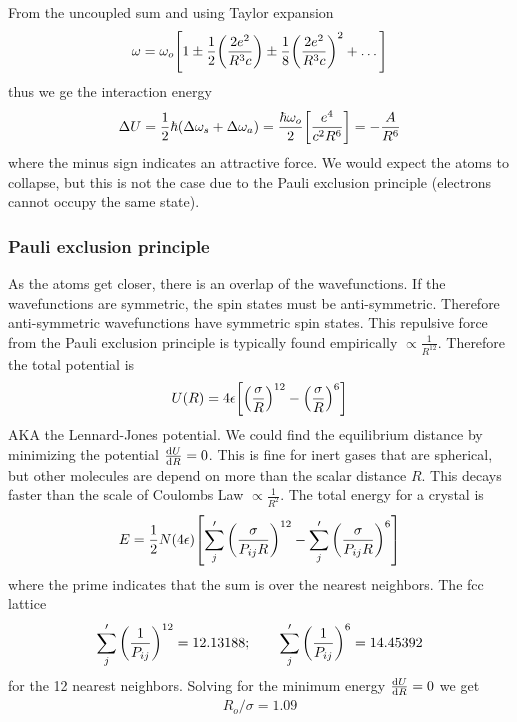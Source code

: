 \documentclass[../main.tex]{subfiles}
\begin{document}
From the uncoupled sum and using Taylor expansion
\begin{align*}
    \omega = \omega_o \qt[1 \pm \frac{1}{2} \qt(\frac{2e^2}{R^3c})
    \pm \frac{1}{8} \qt(\frac{2e^2}{R^3c})^2 + \dots]
\end{align*}
thus we ge the interaction energy
\begin{align*}
    \Delta U = \frac{1}{2} \hbar (\Delta \omega_s + \Delta \omega_a)
    = \frac{\hbar\omega_o}{2} \qt[\frac{e^4}{c^2 R^6}] = -\frac{A}{R^6}
\end{align*}
where the minus sign indicates an attractive force. We would expect the atoms to collapse, but
this is not the case due to the Pauli exclusion principle (electrons cannot occupy the same state).

\subsubsection*{Pauli exclusion principle}

As the atoms get closer, there is an overlap of the wavefunctions. If the wavefunctions are
symmetric, the spin states must be anti-symmetric. Therefore anti-symmetric wavefunctions have
symmetric spin states. This repulsive force from the Pauli exclusion principle is typically
found empirically $\propto \frac{1}{R^{12}}$. Therefore the total potential is
\begin{align*}
    U(R) = 4 \epsilon \qt[\qt(\frac{\sigma}{R})^{12} - \qt(\frac{\sigma}{R})^{6}]
\end{align*}
AKA the Lennard-Jones potential. We could find the equilibrium distance by minimizing the
potential $\dv{U}{R} = 0$. This is fine for inert gases that are spherical, but other molecules are
depend on more than the scalar distance $R$. This decays faster than the scale of Coulombs Law
$\propto \frac{1}{R^2}$. The total energy for a crystal is
\begin{align*}
    E = \frac{1}{2} N (4\epsilon) \qt[
        \sum_j ' \qt(\frac{\sigma}{P_{ij}R})^{12} - \sum_j ' \qt(\frac{\sigma}{P_{ij}R})^{6}
    ]
\end{align*}
where the prime indicates that the sum is over the nearest neighbors. The fcc lattice
\begin{align*}
    \sum_j' \qt(\frac{1}{P_{ij}})^{12} = 12.13188; \qquad \sum_j' \qt(\frac{1}{P_{ij}})^6 = 14.45392
\end{align*}
for the 12 nearest neighbors. Solving for the minimum energy $\dv{U}{R} = 0$ we get 
\begin{align*}
    R_o / \sigma = 1.09
\end{align*}
\end{document}
